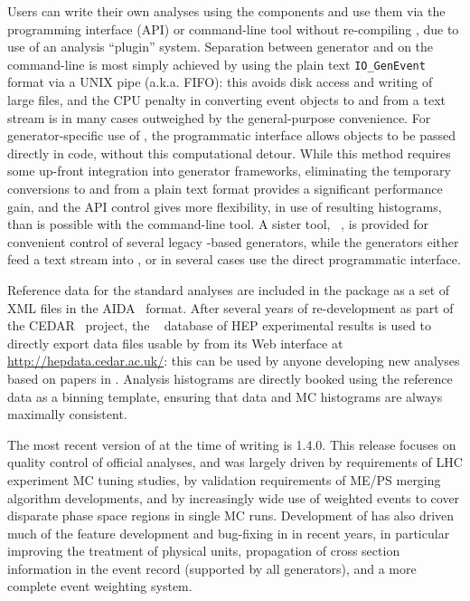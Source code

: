Users can write their own analyses using the \rivet components and use them via
the \rivet programming interface (API) or command-line tool without re-compiling \rivet, due to use of
an analysis ``plugin'' system. Separation between generator and \rivet on the
command-line is most simply achieved by using the \hepmc plain text
\texttt{IO\_GenEvent} format via a UNIX pipe (a.k.a. FIFO): this avoids disk
access and writing of large files, and the CPU penalty in converting event
objects to and from a text stream is in many cases outweighed by the
general-purpose convenience. For generator-specific use of \rivet, the
programmatic interface allows \hepmc objects to be passed directly in code,
without this computational detour. While this method requires some up-front
integration into generator frameworks, eliminating the temporary conversions to and
from a plain text format provides a significant performance gain, and the API
control gives more flexibility, \eg in use of resulting histograms, than is
possible with the command-line tool. A sister tool,
\agile~\cite{Buckley:2007hi}, is provided for convenient control of several
legacy \fortran-based generators, while the \mcnet generators either feed a
\hepmc text stream into \rivet, or in several cases use the direct programmatic
interface.

Reference data for the standard analyses are included in the \rivet package as a
set of XML files in the AIDA~\cite{AIDA} format. After several years of
re-development as part of the CEDAR~\cite{Buckley:2007hi} project, the
\hepdata~\cite{Buckley:2010jn} database of HEP experimental results is used to
directly export data files usable by \rivet from its Web interface at
\url{http://hepdata.cedar.ac.uk/}: this can be used by anyone developing new
analyses based on papers in \hepdata. Analysis histograms are directly booked
using the reference data as a binning template, ensuring that data and MC
histograms are always maximally consistent.


The most recent version of \rivet at the time of writing is 1.4.0. This release
focuses on quality control of official analyses, and was largely driven by
requirements of LHC experiment MC tuning studies, by validation requirements of
\mcnet ME/PS merging algorithm developments, and by increasingly wide use of
weighted events to cover disparate phase space regions in single MC
runs. Development of \rivet has also driven much of the feature development and
bug-fixing in \hepmc in recent years, in particular improving the treatment of
physical units, propagation of cross section information in the event record
(supported by all \mcnet generators), and a more complete event weighting
system.

